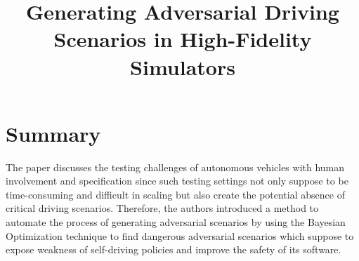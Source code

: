 \documentclass[10pt,a4paper]{report}
\title{Generating Adversarial Driving Scenarios in High-Fidelity Simulators}
\begin{document}
\begin{center}
\textbf{\thetitle}
\end{center}


\section{Summary}
The paper discusses the testing challenges of autonomous vehicles with human involvement and specification since such testing settings not only suppose to be time-consuming and difficult in scaling but also create the potential absence of critical driving scenarios.
%
Therefore, the authors introduced a method to automate the process of generating adversarial scenarios by using the Bayesian Optimization technique to find dangerous adversarial scenarios which suppose to expose weakness of self-driving policies and improve the safety of its software.
%
\end{document}
